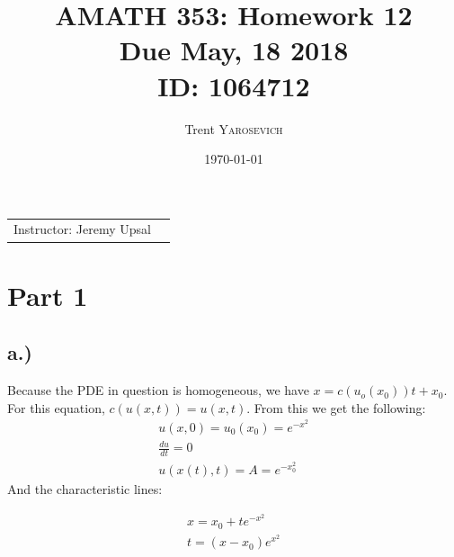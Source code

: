 \documentclass{article}
\title{AMATH 353: Homework 12 \\Due May, 18 2018 \\ ID: 1064712} %
\author{Trent \textsc{Yarosevich}} %
\date{\today} %
\begin{document}
\maketitle %
\setlength\parindent{1cm}

\begin{center}
\begin{tabular}{l r}
Instructor: Jeremy Upsal %
\end{tabular}
\end{center}


\section*{Part 1}
\subsection*{a.)}
Because the PDE in question is homogeneous, we have $x = c(u_o(x_0))t + x_0$. For this equation, $c(u(x,t)) = u(x, t)$. From this we get the following:
\begin{equation}
\begin{aligned}
u(x,0) = u_0(x_0) = e^{-x^2}\\
\frac{du}{dt} = 0\\
u(x(t), t) = A = e^{-x_0^2}
\end{aligned}
\end{equation}
And the characteristic lines:
\begin{tcolorbox}[minipage,colback=white,arc=0pt,outer arc=0pt]
\begin{equation}
\begin{aligned}
x = x_0 + te^{-x^2}\\
t = (x - x_0)e^{x^2}
\end{aligned}
\end{equation}
\end{tcolorbox}
\end{document}
